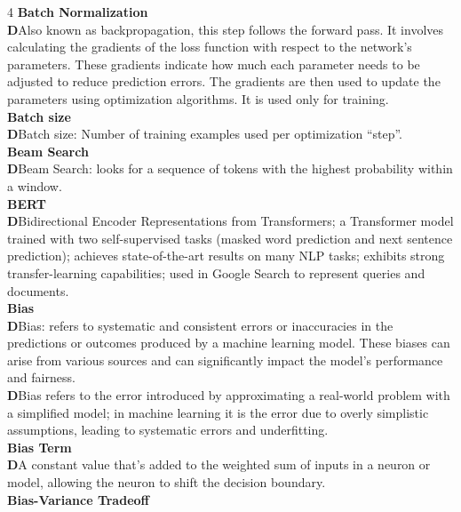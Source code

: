 \documentclass[8pt]{extarticle}
\newcommand{\dtag}{\textcolor{definitioncolor}{\tiny\textbf{D}}\;}
\begin{document}
\begin{multicols}{4}
\vspace{2pt}\textbf{Batch Normalization}\\
\dtag Also known as backpropagation, this step follows the forward pass. It involves calculating the gradients of the loss function with respect to the network's parameters. These gradients indicate how much each parameter needs to be adjusted to reduce prediction errors. The gradients are then used to update the parameters using optimization algorithms. It is used only for training.\\
\vspace{2pt}\textbf{Batch size}\\
\dtag Batch size: Number of training examples used per optimization ``step''.\\
\vspace{2pt}\textbf{Beam Search}\\
\dtag Beam Search: looks for a sequence of tokens with the highest probability within a window.\\
\vspace{2pt}\textbf{BERT}\\
\dtag Bidirectional Encoder Representations from Transformers; a Transformer model trained with two self-supervised tasks (masked word prediction and next sentence prediction); achieves state-of-the-art results on many NLP tasks; exhibits strong transfer-learning capabilities; used in Google Search to represent queries and documents.\\
\vspace{2pt}\textbf{Bias}\\
\dtag Bias: refers to systematic and consistent errors or inaccuracies in the predictions or outcomes produced by a machine learning model. These biases can arise from various sources and can significantly impact the model's performance and fairness.\\
\dtag Bias refers to the error introduced by approximating a real-world problem with a simplified model; in machine learning it is the error due to overly simplistic assumptions, leading to systematic errors and underfitting.\\
\vspace{2pt}\textbf{Bias Term}\\
\dtag A constant value that's added to the weighted sum of inputs in a neuron or model, allowing the neuron to shift the decision boundary.\\
\vspace{2pt}\textbf{Bias-Variance Tradeoff}\\

\end{multicols}
\end{document}
